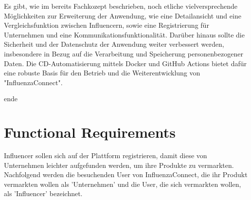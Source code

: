 \documentclass[conference,a4paper,flushend]{cs-techrep}
\begin{document}
Es gibt, wie im bereits Fachkozept beschrieben, noch etliche vielversprechende Möglichkeiten zur Erweiterung der Anwendung, wie eine Detailansicht und eine Vergleichsfunktion zwischen Influencern, sowie eine Registrierung für Unternehmen und eine Kommunikationsfunktionalität. Darüber hinaus sollte die Sicherheit und der Datenschutz der Anwendung weiter verbessert werden, insbesondere in Bezug auf die Verarbeitung und Speicherung personenbezogener Daten. Die CD-Automatisierung mittels Docker und GitHub Actions bietet dafür eine robuste Basis für den Betrieb und die Weiterentwicklung von "InfluenzaConnect". 






\newpage
ende
\newpage
\section{Functional Requirements}
Influencer sollen sich auf der Plattform registrieren, damit diese von Unternehmen leichter aufgefunden werden, um ihre Produkte zu vermarkten. Nachfolgend werden die besuchenden User von InfluenzaConnect, die ihr Produkt vermarkten wollen als 'Unternehmen' und die User, die sich vermarkten wollen, als 'Influencer' bezeichnet.
\end{document}
